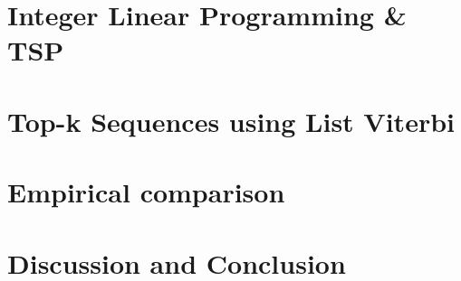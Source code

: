\documentclass[sigconf]{acmart}
\begin{document}
\section{Integer Linear Programming \& TSP}
\label{sec:ilp}


\section{Top-k Sequences using List Viterbi}
\label{sec:viterbi}


\section{Empirical comparison}
\label{sec:experiments}


\section{Discussion and Conclusion}
\label{sec:discussion}




 
\end{document}
